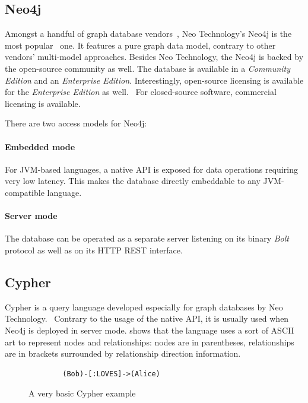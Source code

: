 \subsection{Neo4j}

Amongst a handful of graph database vendors~\cite{graph-dbs}, Neo Technology's Neo4j is the most popular~\cite{graph-dbs-raking} one. It features a pure graph data model, contrary to other vendors' multi-model approaches. Besides Neo Technology, the Neo4j is backed by the open-source community as well. The database is available in a \emph{Community Edition} and an \emph{Enterprise Edition}. Interestingly, open-source licensing is available for the \emph{Enterprise Edition} as well.~\cite{neo4j-opensource} For closed-source software, commercial licensing is available.

There are two access models for Neo4j:

\paragraph{Embedded mode} For JVM-based languages, a native API is exposed for data operations requiring very low latency. This makes the database directly embeddable to any JVM-compatible language.

\paragraph{Server mode} The database can be operated as a separate server listening on its binary \emph{Bolt} protocol as well as on its HTTP REST interface.


\subsection{Cypher}

Cypher is a query language developed especially for graph databases by Neo Technology.~\cite{neo4j-cypher} Contrary to the usage of the native API, it is usually used when Neo4j is deployed in server mode.  shows that the language uses a sort of ASCII art to represent nodes and relationships: nodes are in parentheses, relationships are in brackets surrounded by relationship direction information.

\begin{figure}[!htb]
	\centering
	\begin{minipage}{25em}
		\begin{verbatim}
		(Bob)-[:LOVES]->(Alice)
		\end{verbatim}
	\end{minipage}
  \caption{A very basic Cypher example}
	\label{fig:cypher-intro}
\end{figure}

